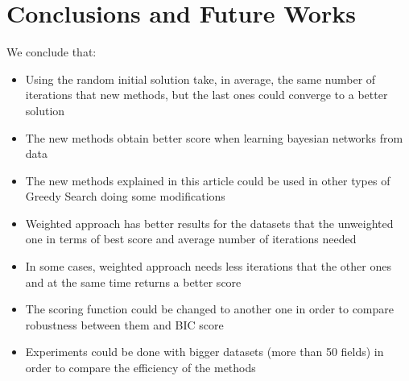 \section{Conclusions and Future Works}
\label{sec:conclusions}

We conclude that:
\begin{itemize}
	\item Using the random initial solution take, in average, the same number of iterations that new methods, but the last ones could converge to a better solution
	\item The new methods obtain better score when learning bayesian networks from data
	\item The new methods explained in this article could be used in other types of Greedy Search doing some modifications
	\item Weighted approach has better results for the datasets that the unweighted one in terms of best score and average number of iterations needed
	\item In some cases, weighted approach needs less iterations that the other ones and at the same time returns a better score
	\item The scoring function could be changed to another one in order to compare robustness between them and BIC score
	\item Experiments could be done with bigger datasets (more than 50 fields) in order to compare the efficiency of the methods
\end{itemize}
